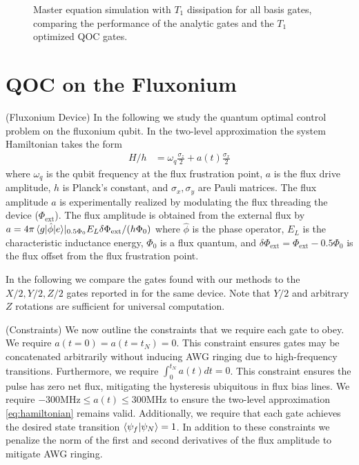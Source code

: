\documentclass[
  amsfonts,
  amsmath,
  tbtags,
  amssymb,
  aps,
  nobibnotes,
  twocolumn,
]{revtex4-2}
\begin{document}
\begin{figure}[ht]
\begin{subfigure}{.3\linewidth}
  \end{subfigure}
  \caption{Master equation simulation with $T_{1}$ dissipation for all basis gates,
    comparing the performance of the analytic gates and the $T_{1}$ optimized QOC gates.}
\end{figure}

\section{QOC on the Fluxonium}
(Fluxonium Device) In the following we study
the quantum optimal control problem on the fluxonium qubit.
In the two-level
approximation the system Hamiltonian takes the form
\label{eq:hamiltonian}
\begin{align}
  H/h &= \omega_{q} \frac{\sigma_{z}}{2} + a(t) \frac{\sigma_{x}}{2}
\end{align}
where $\omega_{q}$ is the qubit frequency at the flux frustration point,
$a$ is the flux drive amplitude, $h$ is Planck's constant, and $\sigma_{x}, \sigma_{y}$
are Pauli matrices. The flux amplitude $a$ is experimentally
realized by modulating the flux 
threading the device ($\Phi_{\textrm{ext}}$).
The flux amplitude is obtained from the external flux by
$a = 4 \pi \braket{g \lvert \hat{\phi} \rvert e} \rvert_{0.5 \Phi_{0}} E_{L}
\delta \Phi_{\textrm{ext}} / (h \Phi_{0})$
where $\hat{\phi}$ is the phase operator, $E_{L}$ is the characteristic inductance energy, $\Phi_{0}$
is a flux quantum, and
$\delta \Phi_{\textrm{ext}} = \Phi_{\textrm{ext}} - 0.5 \Phi_{0}$ is the flux
offset from the flux frustration point.

In the following we compare the gates found with our methods
to the $X/2, Y/2, Z/2$ gates reported in \cite{zhang2020universal}
for the same device. Note that $Y/2$ and arbitrary $Z$ rotations
are sufficient for universal computation.

(Constraints) We now outline the constraints that we require each gate
to obey.
We require $a(t = 0) = a(t = t_{N}) = 0$.
This constraint ensures gates may be concatenated arbitrarily without
inducing AWG ringing due to high-frequency transitions.
Furthermore, we require $\int_{0}^{t_{N}} a(t) dt = 0$. This
constraint ensures the pulse has zero net flux, mitigating
the hysteresis ubiquitous in flux bias lines.
We require $-300 \textrm{MHz} \le a(t) \le 300 \textrm{MHz}$
to ensure the two-level approximation \ref{eq:hamiltonian}
remains valid. Additionally, we require that each gate achieves
the desired state transition $\braket{\psi_{f} \lvert \psi_{N}} = 1$.
In addition to these constraints we penalize the norm
of the first and second derivatives of the flux amplitude
to mitigate AWG ringing.
\end{document}
